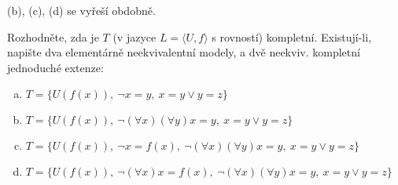 \begin{problem}
\begin{solution}
        (b), (c), (d) se vyřeší obdobně. 
                    
    \end{solution}

\end{problem}


\begin{problem}

    Rozhodněte, zda je $T$ (v jazyce $L = \langle U, f \rangle$ s rovností) kompletní. Existují-li, napište dva elementárně neekvivalentní modely, a dvě neekviv. kompletní jednoduché extenze:
    \begin{enumerate}[(a)]
        \item  $T = \{U(f(x)),\ \neg x=y,\ x =y\vee y=z\}$
        \item $T = \{U(f(x)),\ \neg (\forall x)(\forall y)x=y,\ x =y\vee y=z\}$
        \item  $T = \{U(f(x)),\ \neg x=f(x),\ \neg (\forall x)(\forall y)x=y,\ x =y\vee y=z\}$
        \item  $T = \{U(f(x)),\ \neg (\forall x) x=f(x),\ \neg (\forall x)(\forall y)x=y,\ x =y\vee y=z\}$
    \end{enumerate}


\end{problem}
